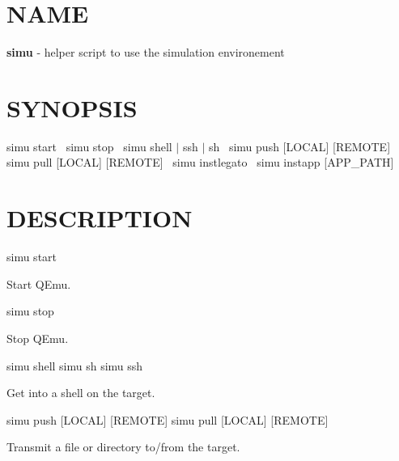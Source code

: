 \section*{N\+A\+M\+E}

{\bfseries simu} -\/ helper script to use the simulation environement

\section*{S\+Y\+N\+O\+P\+S\+I\+S}

{\ttfamily simu start}~\newline
 {\ttfamily simu stop}~\newline
 {\ttfamily simu shell $\vert$ ssh $\vert$ sh}~\newline
 {\ttfamily simu push \mbox{[}L\+O\+C\+A\+L\mbox{]} \mbox{[}R\+E\+M\+O\+T\+E\mbox{]}}~\newline
 {\ttfamily simu pull \mbox{[}L\+O\+C\+A\+L\mbox{]} \mbox{[}R\+E\+M\+O\+T\+E\mbox{]}}~\newline
 {\ttfamily simu instlegato}~\newline
 {\ttfamily simu instapp \mbox{[}A\+P\+P\+\_\+\+P\+A\+T\+H\mbox{]}}~\newline


\section*{D\+E\+S\+C\+R\+I\+P\+T\+I\+O\+N}

simu start
\begin{DoxyItemize}
\item Start Q\+Emu.
\end{DoxyItemize}

simu stop
\begin{DoxyItemize}
\item Stop Q\+Emu.
\end{DoxyItemize}

simu shell simu sh simu ssh
\begin{DoxyItemize}
\item Get into a shell on the target.
\end{DoxyItemize}

simu push \mbox{[}L\+O\+C\+A\+L\mbox{]} \mbox{[}R\+E\+M\+O\+T\+E\mbox{]} simu pull \mbox{[}L\+O\+C\+A\+L\mbox{]} \mbox{[}R\+E\+M\+O\+T\+E\mbox{]}
\begin{DoxyItemize}
\item Transmit a file or directory to/from the target.
\end{DoxyItemize}

